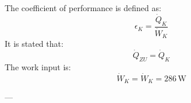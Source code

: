 The coefficient of performance is defined as:  
\[
\epsilon_K = \frac{\dot{Q}_K}{\dot{W}_K}
\]  
It is stated that:  
\[
\dot{Q}_{ZU} = \dot{Q}_K
\]  
The work input is:  
\[
\dot{W}_K = \dot{W}_K = 286 \, \text{W}
\]

---